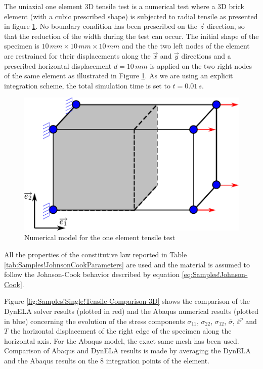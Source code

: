 The uniaxial one element 3D tensile test is a numerical test where
a 3D brick element (with a cubic prescribed shape) is subjected to
radial tensile as presented in figure \ref{fig:Samples!Single!Tensile-3D}.
No boundary condition has been prescribed on the $\overrightarrow{z}$
direction, so that the reduction of the width during the test can
occur. The initial shape of the specimen is $10\,mm\times10\,mm\times10\,mm$
and the the two left nodes of the element are restrained for their
displacements along the $\overrightarrow{x}$ and $\overrightarrow{y}$
directions and a prescribed horizontal displacement $d=10\,mm$ is
applied on the two right nodes of the same element as illustrated
in Figure \ref{fig:Samples!Single!Tensile-3D}. As we are using an
explicit integration scheme, the total simulation time is set to $t=0.01\,s$.
\begin{figure}[h]
\begin{centering}
\includegraphics[width=0.5\columnwidth]{Figures/SamplesSingleTensile3D}
\par\end{centering}
\caption{Numerical model for the one element tensile test\label{fig:Samples!Single!Tensile-3D}}
\end{figure}

All the properties of the constitutive law reported in Table \ref{tab:Samples!JohnsonCookParameters}
are used and the material is assumed to follow the Johnson-Cook behavior
described by equation \ref{eq:Samples!Johnson-Cook}.

Figure \ref{fig:Samples!Single!Tensile-Comparison-3D} shows the comparison
of the DynELA solver results (plotted in red) and the Abaqus numerical
results (plotted in blue) concerning the evolution of the stress components
$\sigma_{11}$, $\sigma_{22}$, $\sigma_{12}$, $\overline{\sigma}$,
$\overline{\varepsilon}^{p}$ and $T$ \versus  the horizontal displacement
of the right edge of the specimen along the horizontal axis. For the
Abaqus model, the exact same mesh has been used. Comparison of Abaqus
and DynELA results is made by averaging the DynELA and the Abaqus
results on the $8$ integration points of the element.

